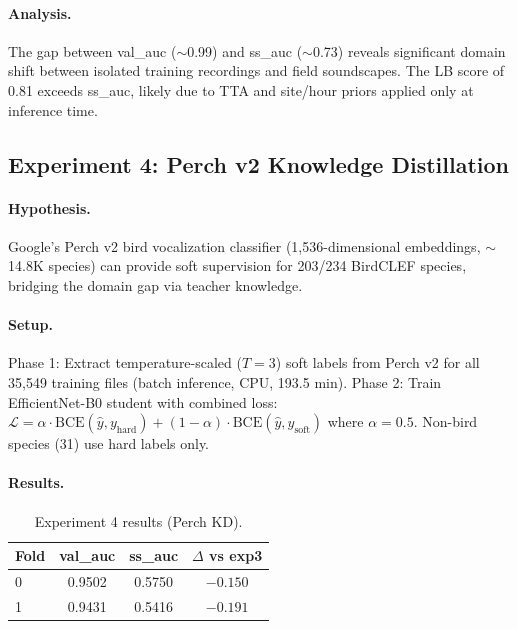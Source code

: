 \paragraph{Analysis.}
The gap between val\_auc ($\sim$0.99) and ss\_auc ($\sim$0.73) reveals significant
domain shift between isolated training recordings and field soundscapes.
The LB score of 0.81 exceeds ss\_auc, likely due to TTA and site/hour priors
applied only at inference time.

\subsection{Experiment 4: Perch v2 Knowledge Distillation}
\label{sec:exp4}

\paragraph{Hypothesis.}
Google's Perch v2 bird vocalization classifier (1,536-dimensional embeddings,
$\sim$14.8K species) can provide soft supervision for 203/234 BirdCLEF species,
bridging the domain gap via teacher knowledge.

\paragraph{Setup.}
Phase 1: Extract temperature-scaled ($T=3$) soft labels from Perch v2 for all
35,549 training files (batch inference, CPU, 193.5 min).
Phase 2: Train EfficientNet-B0 student with combined loss:
$\mathcal{L} = \alpha \cdot \text{BCE}(\hat{y}, y_\text{hard}) + (1-\alpha) \cdot \text{BCE}(\hat{y}, y_\text{soft})$
where $\alpha = 0.5$. Non-bird species (31) use hard labels only.

\paragraph{Results.}
\begin{table}[h]
\centering
\caption{Experiment 4 results (Perch KD).}
\label{tab:exp4}
\begin{tabular}{lccc}
\hline
\textbf{Fold} & \textbf{val\_auc} & \textbf{ss\_auc} & \textbf{$\Delta$ vs exp3} \\
\hline
0 & 0.9502 & 0.5750 & $-0.150$ \\
1 & 0.9431 & 0.5416 & $-0.191$ \\
\hline
\end{tabular}
\end{table}

